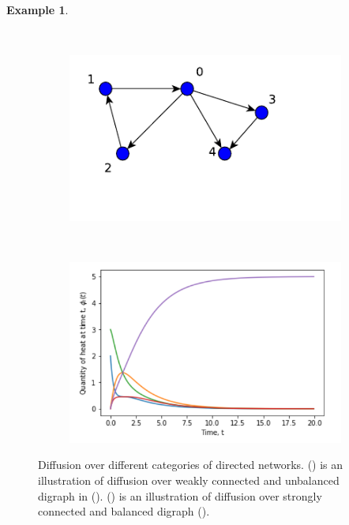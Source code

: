 \documentclass[10pt,a4paper]{article}
\theoremstyle{plain}
\theoremstyle{definition}
\newtheorem{exa}[subsection]{Example}
\begin{document}
\begin{exa}
\begin{figure}[H]
\begin{subfigure}[b]{0.5\textwidth}
      	    	\caption{}
      	    	\label{plot-balanced}
      	    \end{subfigure} \\
            \begin{subfigure}[b]{0.40\textwidth}
            	\includegraphics[width=\textwidth]{images/UnbalanceDigraph.pdf}
            	\caption{}
            	\label{unbalanced-graph}
            \end{subfigure}~
            \begin{subfigure}[b]{0.5\textwidth}
            	\includegraphics[width= \textwidth]{images/non-balnceddigraph-difusion.png}
            	\caption{}
            	\label{plot-unbalanced}
            \end{subfigure}
      		\caption{Diffusion over different categories of directed networks. () is an illustration of diffusion over weakly connected and unbalanced digraph in (). () is an illustration of diffusion over strongly connected and balanced digraph ().  }  

\end{figure}
\end{exa}
\end{document}
